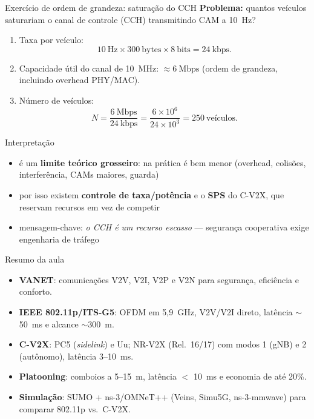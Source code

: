 \documentclass[aspectratio=169,11pt]{beamer}
\begin{document}
\begin{frame}{Exercício de ordem de grandeza: saturação do CCH}
  \textbf{Problema:} quantos veículos saturariam o canal de controle (CCH) transmitindo CAM a 10~Hz?
  \begin{enumerate}
    \item Taxa por veículo:
      \[ 10~\text{Hz} \times 300~\text{bytes} \times 8~\text{bits} = 24~\text{kbps}. \]
    \item Capacidade útil do canal de 10~MHz: $\approx 6~\text{Mbps}$ (ordem de grandeza, incluindo overhead PHY/MAC).
    \item Número de veículos:
      \[ N = \frac{6~\text{Mbps}}{24~\text{kbps}} = \frac{6\times 10^6}{24\times 10^3} = 250\ \text{veículos}. \]
  \end{enumerate}
  \pause
  \begin{alertblock}{Interpretação}
    \begin{itemize}
      \item é um \textbf{limite teórico grosseiro}: na prática é bem menor (overhead, colisões, interferência, CAMs maiores, guarda)
      \item por isso existem \textbf{controle de taxa/potência} e o \textbf{SPS} do C-V2X, que reservam recursos em vez de competir
      \item mensagem-chave: \emph{o CCH é um recurso escasso} --- segurança cooperativa exige engenharia de tráfego
    \end{itemize}
  \end{alertblock}
\end{frame}

\begin{frame}{Resumo da aula}
  \begin{itemize}
    \item \textbf{VANET}: comunicações V2V, V2I, V2P e V2N para segurança, eficiência e conforto.
    \item \textbf{IEEE 802.11p/ITS-G5}: OFDM em 5,9~GHz, V2V/V2I direto, latência $\sim$50~ms e alcance $\sim$300~m.
    \item \textbf{C-V2X}: PC5 (\emph{sidelink}) e Uu; NR-V2X (Rel.~16/17) com modos 1 (gNB) e 2 (autônomo), latência 3--10~ms.
    \item \textbf{Platooning}: comboios a 5--15~m, latência $<$ 10~ms e economia de até 20\%.
    \item \textbf{Simulação}: SUMO + ns-3/OMNeT++ (Veins, Simu5G, ns-3-mmwave) para comparar 802.11p vs.\ C-V2X.
  \end{itemize}
\end{frame}
\end{document}
